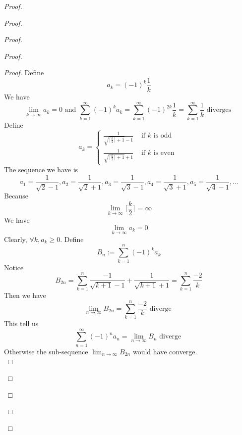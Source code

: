 \documentclass{report}
\begin{document}
\begin{proof}
\begin{proof}
\begin{proof}
\begin{proof}
\begin{proof}
Define
\begin{equation*}
a_k=(-1)^k \frac{1}{k}
\end{equation*}
We have
\begin{equation*}
\lim_{k\to\infty}a_k=0\text{ and }\sum_{k=1}^\infty (-1)^k a_k=\sum_{k=1}^\infty (-1)^{2k}\frac{1}{k}=\sum_{k=1}^\infty \frac{1}{k}\text{ diverges }
\end{equation*}
Define
\begin{equation*}
a_k=\begin{cases}
\frac{1}{\sqrt{\lceil \frac{k}{2} \rceil +1}-1}& \text{ if $k$ is odd }\\
\frac{1}{\sqrt{\lceil \frac{k}{2} \rceil +1}+1 }& \text{ if $k$ is even }
\end{cases}
\end{equation*}
The sequence we have is
\begin{equation*}
a_1=\frac{1}{\sqrt{2} -1},a_2=\frac{1}{\sqrt{2} +1},a_3=\frac{1}{\sqrt{3} -1},a_4=\frac{1}{\sqrt{3} +1},a_5=\frac{1}{\sqrt{4} -1},\dots
\end{equation*}
Because 
\begin{equation*}
\lim_{k\to\infty} \lceil \frac{k}{2}\rceil =\infty
\end{equation*}
We have
\begin{equation*}
\lim_{k\to\infty} a_k=0
\end{equation*}
Clearly, $\forall k,a_k\geq 0$. Define
\begin{equation*}
B_n:=\sum_{k=1}^n (-1)^k a_k
\end{equation*}
Notice
\begin{equation*}
B_{2n}=\sum_{k=1}^n \frac{-1}{\sqrt{k+1}-1}+\frac{1}{\sqrt{k+1} +1}=\sum_{k=1}^n \frac{-2}{k}
\end{equation*}
Then we have
\begin{equation*}
\lim_{n\to\infty}B_{2n}=\sum_{k=1}^n \frac{-2}{k}\text{ diverge }
\end{equation*}
This tell us
\begin{equation*}
\sum_{n=1}^\infty (-1)^n a_n=\lim_{n\to\infty}B_{n}\text{ diverge }
\end{equation*}
Otherwise the sub-sequence $\lim_{n\to\infty}B_{2n}$ would have converge.\\


\end{proof}
\end{proof}
\end{proof}
\end{proof}
\end{proof}
\end{document}
